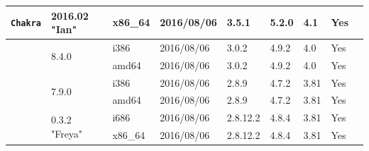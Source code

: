 \documentclass[11pt,twoside,openany,x11names,svgnames]{memoir}
\begin{document}
{\begin{longtable}{| >{\bfseries}p{3cm} | p{2cm} | p{1cm} | p{2cm} | p{1.2cm} | p{1cm} | p{1cm} | p{1cm} | p{1.5cm} |}
	\texttt{Chakra}                               & 2016.02 "Ian"                  & x86\_64& 2016/08/06  & 3.5.1    & 5.2.0 & 4.1   & Yes   &  \\	
	
	\hline
	\hline
	
	\multirow{4}{*}{\texttt{Debian}}              & \multirow{2}{*}{8.4.0}         & i386   & 2016/08/06  & 3.0.2    & 4.9.2 & 4.0   & Yes   &  \\
											    							       \cline{3-8}
	                                              &                                & amd64  & 2016/08/06  & 3.0.2    & 4.9.2 & 4.0   & Yes   &  \\
	                                              \cline{2-8}
	                                              & \multirow{2}{*}{7.9.0}         & i386   & 2016/08/06  & 2.8.9    & 4.7.2 & 3.81  & Yes   &  \\
	                                            							       \cline{3-8}
	                                              &                                & amd64  & 2016/08/06  & 2.8.9    & 4.7.2 & 3.81  & Yes   &  \\
	
	\hline
	\hline
	
	\multirow{2}{*}{\texttt{elementary OS}}       & \multirow{2}{*}{0.3.2 "Freya"} & i686   & 2016/08/06  & 2.8.12.2 & 4.8.4 & 3.81  & Yes   &  \\
											    							       \cline{3-8}
	                                              &                                & x86\_64& 2016/08/06  & 2.8.12.2 & 4.8.4 & 3.81  & Yes   &  \\
	                                             
	\hline
	\hline
	

\end{longtable}}
\end{document}
